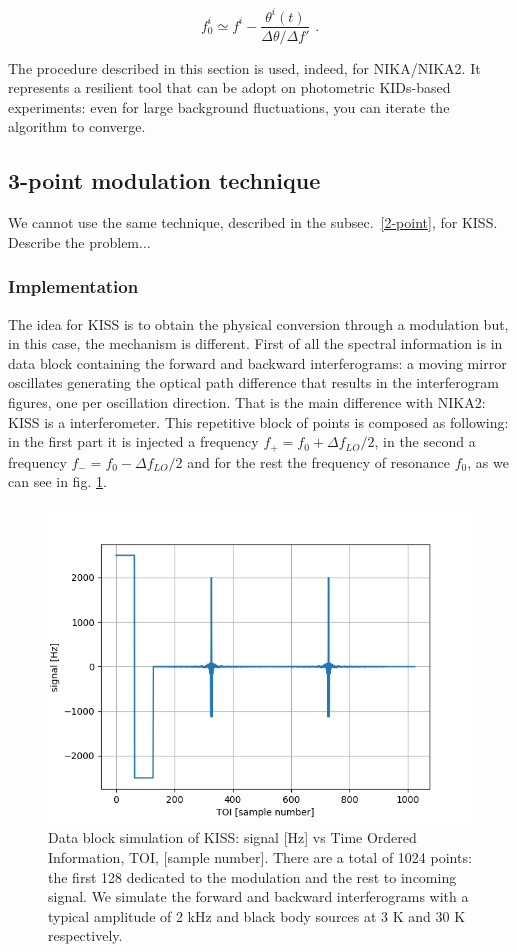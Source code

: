 \documentclass[twocolumn,traditabstract]{aa}\\
\begin{document}
\begin{equation}
f^i_0 \simeq f^i - \frac{\theta^i(t)}{\Delta\theta/\Delta f'} \text{ .}
\end{equation}

The procedure described in this section is used, indeed, for NIKA/NIKA2. It represents a resilient tool that can be adopt on photometric KIDs-based experiments: even for large background fluctuations, you can iterate the algorithm to converge.
\color{black}

\subsection{3-point modulation technique}

We cannot use the same technique, described in the subsec.~\ref{2-point}, for KISS. Describe the problem...

\subsubsection{Implementation}
The idea for KISS is to obtain the physical conversion through a modulation but, in this case, the mechanism is different. First of all the spectral information is in data block containing the forward and backward interferograms: a moving mirror oscillates generating the optical path difference that results in the interferogram figures, one per oscillation direction. That is the main difference with NIKA2: KISS is a interferometer. This repetitive block of points is composed as following: in the first part it is injected a frequency $f_+ = f_0 + \Delta f_{LO}/2$, in the second a frequency $f_- = f_0 - \Delta f_{LO}/2$ and for the rest the frequency of resonance $f_0$, as we can see in fig. \ref{fig:mod}.

\begin{figure}[htf]
	\centering
	\includegraphics[width=.5\textwidth]{3.acqui/block_data.png}
	\caption{Data block simulation of KISS: signal [Hz] vs Time Ordered Information, TOI, [sample number]. There are a total of 1024 points: the first 128 dedicated to the modulation and the rest to incoming signal. We simulate the forward and backward interferograms with a typical amplitude of 2 kHz and black body sources at 3 K and 30 K respectively.}
	\label{fig:mod}
\end{figure}
\end{document}
